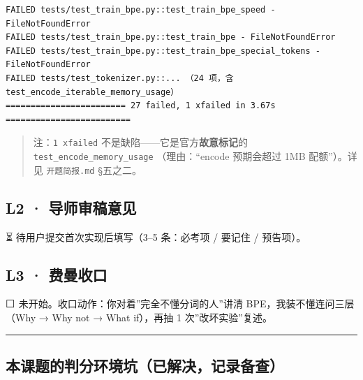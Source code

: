 \documentclass[
  chinese,
  11pt,
]{ctexart}
\begin{document}
\begin{verbatim}
FAILED tests/test_train_bpe.py::test_train_bpe_speed - FileNotFoundError
FAILED tests/test_train_bpe.py::test_train_bpe - FileNotFoundError
FAILED tests/test_train_bpe.py::test_train_bpe_special_tokens - FileNotFoundError
FAILED tests/test_tokenizer.py::... （24 项，含 test_encode_iterable_memory_usage）
======================== 27 failed, 1 xfailed in 3.67s =========================
\end{verbatim}

\begin{quote}
注：\texttt{1\ xfailed} 不是缺陷------它是官方\textbf{故意标记}的 \texttt{test\_encode\_memory\_usage} （理由：``encode 预期会超过 1MB 配额''）。详见 \texttt{开题简报.md} §五之二。
\end{quote}

\subsection{L2 · 导师审稿意见}\label{l2-ux5bfcux5e08ux5ba1ux7a3fux610fux89c1}

⏳ 待用户提交首次实现后填写（3--5 条：必考项 / 要记住 / 预告项）。

\subsection{L3 · 费曼收口}\label{l3-ux8d39ux66fcux6536ux53e3}

⬜ 未开始。收口动作：你对着''完全不懂分词的人''讲清 BPE，我装不懂连问三层 （Why → Why not → What if），再抽 1 次''改坏实验''复述。

\begin{center}\rule{0.5\linewidth}{0.5pt}\end{center}

\subsection{本课题的判分环境坑（已解决，记录备查）}\label{ux672cux8bfeux9898ux7684ux5224ux5206ux73afux5883ux5751ux5df2ux89e3ux51b3ux8bb0ux5f55ux5907ux67e5}
\end{document}
